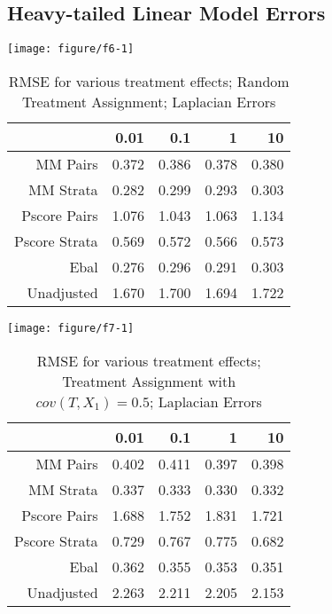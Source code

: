 \documentclass[11pt]{article}\usepackage[]{graphicx}\usepackage[]{color}
\makeatletter
\def\maxwidth{ %
  \ifdim\Gin@nat@width>\linewidth
    \linewidth
  \else
    \Gin@nat@width
  \fi
}
\newenvironment{knitrout}{}{} %
\makeatother
\begin{document}
\subsection{Heavy-tailed Linear Model Errors}
\begin{knitrout}
\color{fgcolor}

{\centering \texttt{[image: figure/f6-1]} 

}



\end{knitrout}
\begin{table}[ht]
\centering
\begin{tabular}{rrrrr}
  \hline
 & 0.01 & 0.1 & 1 & 10 \\ 
  \hline
MM Pairs & 0.372 & 0.386 & 0.378 & 0.380 \\ 
  MM Strata & 0.282 & 0.299 & 0.293 & 0.303 \\ 
  Pscore Pairs & 1.076 & 1.043 & 1.063 & 1.134 \\ 
  Pscore Strata & 0.569 & 0.572 & 0.566 & 0.573 \\ 
  Ebal & 0.276 & 0.296 & 0.291 & 0.303 \\ 
  Unadjusted & 1.670 & 1.700 & 1.694 & 1.722 \\ 
   \hline
\end{tabular}
\caption{RMSE for various treatment effects; Random Treatment Assignment; Laplacian Errors} 
\label{tab:f6}
\end{table}


\begin{knitrout}
\color{fgcolor}

{\centering \texttt{[image: figure/f7-1]} 

}



\end{knitrout}

\begin{table}[ht]
\centering
\begin{tabular}{rrrrr}
  \hline
 & 0.01 & 0.1 & 1 & 10 \\ 
  \hline
MM Pairs & 0.402 & 0.411 & 0.397 & 0.398 \\ 
  MM Strata & 0.337 & 0.333 & 0.330 & 0.332 \\ 
  Pscore Pairs & 1.688 & 1.752 & 1.831 & 1.721 \\ 
  Pscore Strata & 0.729 & 0.767 & 0.775 & 0.682 \\ 
  Ebal & 0.362 & 0.355 & 0.353 & 0.351 \\ 
  Unadjusted & 2.263 & 2.211 & 2.205 & 2.153 \\ 
   \hline
\end{tabular}
\caption{RMSE for various treatment effects; Treatment Assignment with $cov(T, X_1) = 0.5$; Laplacian Errors} 
\label{tab:f7}
\end{table}
\end{document}
